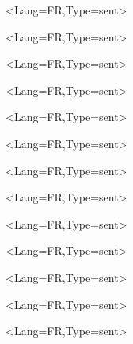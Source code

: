 \documentclass[a5paper,11pt]{article}
\begin{document}
\pagestyle{empty}

\begin{EnvtExo}%
	\ipsum<Lang=FR,Type=sent>
\end{EnvtExo}

\begin{EnvtExo}[Trait=pointilles]%
	\ipsum<Lang=FR,Type=sent>
\end{EnvtExo}

\begin{EnvtExo}[Trait=dashilles]%
	\ipsum<Lang=FR,Type=sent>
\end{EnvtExo}

\begin{EnvtExo}[Decoration=Icone/\faPython]%
	\ipsum<Lang=FR,Type=sent>
\end{EnvtExo}

\begin{EnvtExo}[Decoration=Ceinture/rouge]%
	\ipsum<Lang=FR,Type=sent>
\end{EnvtExo}

\begin{EnvtExo}[Decoration=Chrono/20]%
	\ipsum<Lang=FR,Type=sent>
\end{EnvtExo}

\begin{EnvtExo}[Etoiles=2,Decoration=Image/goku_ssj4]%
	\ipsum<Lang=FR,Type=sent>
\end{EnvtExo}

\begin{EnvtExo}[Decoration=faEtoiles/1.5§4]%
	\ipsum<Lang=FR,Type=sent>
\end{EnvtExo}

\begin{EnvtExo}[Decoration=tkzEtoiles/3.5§5]%
	\ipsum<Lang=FR,Type=sent>
\end{EnvtExo}

\begin{EnvtExo}[Decoration=Speedo/4.25§6]%
	\ipsum<Lang=FR,Type=sent>
\end{EnvtExo}

\begin{EnvtExo}[Decoration=Points/7.5]%
	\ipsum<Lang=FR,Type=sent>
\end{EnvtExo}

\begin{EnvtExo}[Decoration=Barres/V2]%
	\ipsum<Lang=FR,Type=sent>
\end{EnvtExo}

\begin{EnvtExo}[Type=Perso/{Titre perso },Etoiles={2.5§5}]%
	\ipsum<Lang=FR,Type=sent>
\end{EnvtExo}
\end{document}
